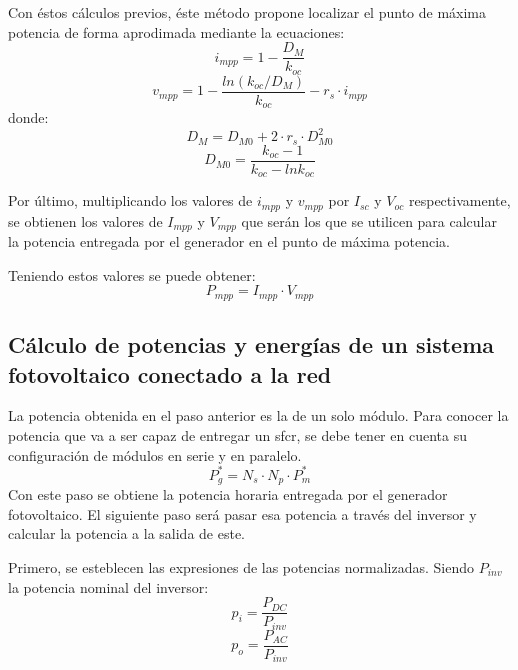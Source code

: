 Con éstos cálculos previos, éste método propone localizar el punto de máxima potencia de forma aprodimada mediante la ecuaciones:
\begin{equation}
i_{mpp}=1-\frac{D_M}{k_{oc}}
\end{equation}
\begin{equation}
v_{mpp}=1-\frac{ln(k_{oc}/D_M)}{k_{oc}}-r_s\cdot i_{mpp}
\end{equation}
donde:
\begin{equation}
D_M=D_{M0}+2\cdot r_s\cdot D_{M0}^2
\end{equation}
\begin{equation}
D_{M0}=\frac{k_{oc}-1}{k_{oc}-lnk_{oc}}
\end{equation}

Por último, multiplicando los valores de \(i_{mpp}\) y \(v_{mpp}\) por \(I_{sc}\) y \(V_{oc}\) respectivamente, se obtienen los valores de \(I_{mpp}\) y \(V_{mpp}\) que serán los que se utilicen para calcular la potencia entregada por el generador en el punto de máxima potencia.

Teniendo estos valores se puede obtener:
\begin{equation}
P_{mpp}=I_{mpp}\cdot V_{mpp}
\end{equation}

\subsection{Cálculo de potencias y energías de un sistema fotovoltaico conectado a la red}
\label{sec:org789dcbd}
\label{subsec:calculo-potencias-energias}
La potencia obtenida en el paso anterior es la de un solo módulo. Para conocer la potencia que va a ser capaz de entregar un sfcr, se debe tener en cuenta su configuración de módulos en serie y en paralelo.
\begin{equation}
P_g^*=N_s\cdot N_p\cdot P_m^*
\end{equation}
Con este paso se obtiene la potencia horaria entregada por el generador fotovoltaico. El siguiente paso será pasar esa potencia a través del inversor y calcular la potencia a la salida de este.

Primero, se esteblecen las expresiones de las potencias normalizadas. Siendo \(P_{inv}\) la potencia nominal del inversor:
\begin{equation}
p_i=\frac{P_{DC}}{P_{inv}}
\end{equation}
\begin{equation}
p_o=\frac{P_{AC}}{P_{inv}}
\end{equation}

